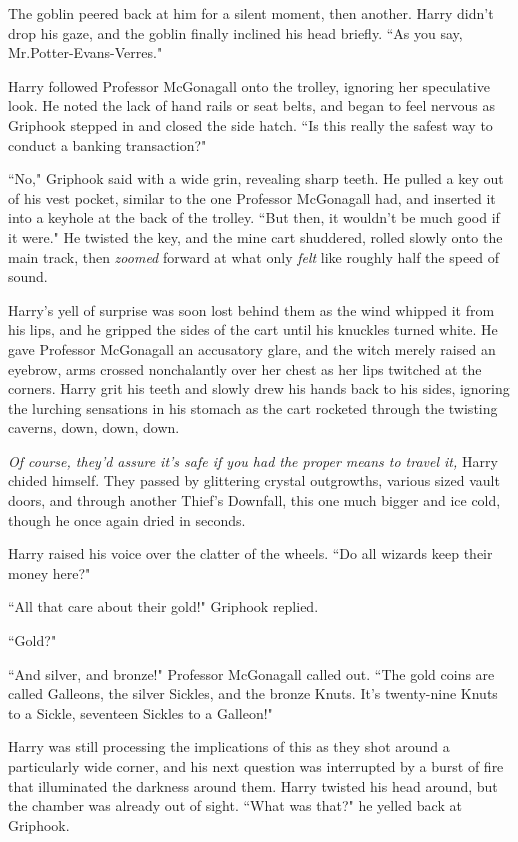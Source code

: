 The goblin peered back at him for a silent moment, then another. Harry didn't drop his gaze, and the goblin finally inclined his head briefly. ``As you say, Mr.\?Potter-Evans-Verres."

Harry followed Professor McGonagall onto the trolley, ignoring her speculative look. He noted the lack of hand rails or seat belts, and began to feel nervous as Griphook stepped in and closed the side hatch. ``Is this really the safest way to conduct a banking transaction?"

``No," Griphook said with a wide grin, revealing sharp teeth. He pulled a key out of his vest pocket, similar to the one Professor McGonagall had, and inserted it into a keyhole at the back of the trolley. ``But then, it wouldn't be much good if it were." He twisted the key, and the mine cart shuddered, rolled slowly onto the main track, then \emph{zoomed} forward at what only \emph{felt} like roughly half the speed of sound.

Harry's yell of surprise was soon lost behind them as the wind whipped it from his lips, and he gripped the sides of the cart until his knuckles turned white. He gave Professor McGonagall an accusatory glare, and the witch merely raised an eyebrow, arms crossed nonchalantly over her chest as her lips twitched at the corners. Harry grit his teeth and slowly drew his hands back to his sides, ignoring the lurching sensations in his stomach as the cart rocketed through the twisting caverns, down, down, down.

\emph{Of course, they'd assure it's safe if you had the proper means to travel it,} Harry chided himself. They passed by glittering crystal outgrowths, various sized vault doors, and through another Thief's Downfall, this one much bigger and ice cold, though he once again dried in seconds.

Harry raised his voice over the clatter of the wheels. ``Do all wizards keep their money here?"

``All that care about their gold!" Griphook replied.

``Gold?"

``And silver, and bronze!" Professor McGonagall called out. ``The gold coins are called Galleons, the silver Sickles, and the bronze Knuts. It's twenty-nine Knuts to a Sickle, seventeen Sickles to a Galleon!"

Harry was still processing the implications of this as they shot around a particularly wide corner, and his next question was interrupted by a burst of fire that illuminated the darkness around them. Harry twisted his head around, but the chamber was already out of sight. ``What was that?" he yelled back at Griphook.

